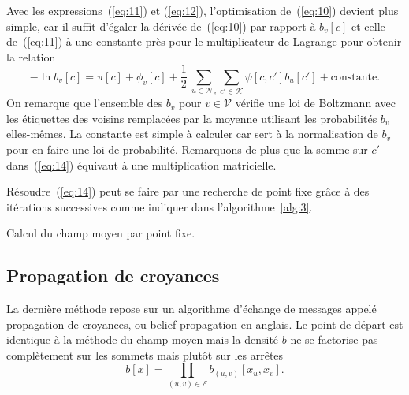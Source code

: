 \documentclass[a4paper,11pt,oneside]{article}
\begin{document}
Avec les expressions~(\ref{eq:11}) et (\ref{eq:12}),
l'optimisation de~(\ref{eq:10}) devient plus simple, car il
suffit d'égaler la dérivée de~(\ref{eq:10}) par rapport
à $b_v[c]$ et celle de~(\ref{eq:11}) à une constante près
pour le multiplicateur de Lagrange pour obtenir la relation
\begin{equation}
  \label{eq:14}
  -\ln b_v[c]
  = \pi[c] + \phi_v[c] + \frac12\: \sum_{u\in\mathcal N_v}
    \sum_{c'\in\mathcal K} \psi[c, c'] b_u[c']
  + \text{constante}.
\end{equation}
On remarque que l'ensemble des $b_v$ pour $v\in\mathcal V$
vérifie une loi de Boltzmann avec les étiquettes des voisins
remplacées par la moyenne utilisant les probabilités $b_v$
elles-mêmes. La constante est simple à calculer car sert
à la normalisation de $b_v$ pour en faire une loi de
probabilité. Remarquons de plus que la somme sur $c'$
dans~(\ref{eq:14}) équivaut à une multiplication
matricielle.

Résoudre~(\ref{eq:14}) peut se faire par une recherche de
point fixe grâce à des itérations successives comme indiquer
dans l'algorithme~\ref{alg:3}.

\begin{algorithm}
  \caption{Calcul du champ moyen par point fixe.}
  \label{alg:3}
\end{algorithm}


\subsection{Propagation de croyances}
\label{sec:bp}

La dernière méthode repose sur un algorithme d'échange de
messages appelé propagation de croyances, ou
\textenglish{belief propagation} en anglais. Le point de
départ est identique à la méthode du champ moyen mais la
densité $b$ ne se factorise pas complètement sur les sommets
mais plutôt sur les arrêtes
\begin{equation}
  \label{eq:15}
  b[x] = \prod_{(u,v)\in\mathcal E} b_{(u,v)}[x_u, x_v].
\end{equation}
\end{document}
